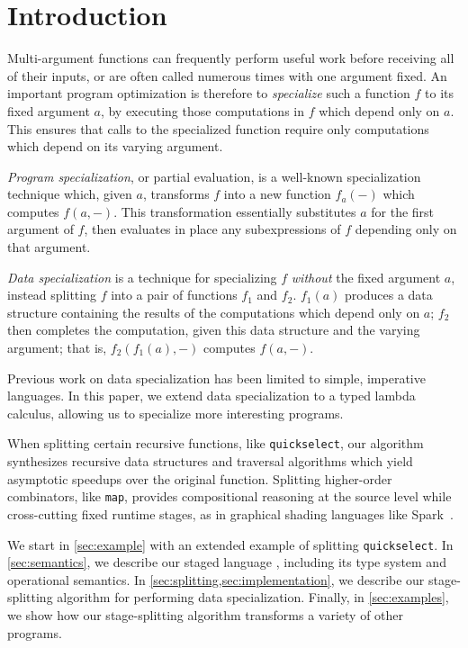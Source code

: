 \section{Introduction}

Multi-argument functions can frequently perform useful work before receiving all
of their inputs, or are often called numerous times with one argument fixed. An
important program optimization is therefore to \emph{specialize} such a function
$f$ to its fixed argument $a$, by executing those computations in $f$ which
depend only on $a$. This ensures that calls to the specialized function require
only computations which depend on its varying argument.

\emph{Program specialization}, or partial evaluation, is a well-known
specialization technique which, given $a$, transforms $f$ into a new function
$f_a(-)$ which computes $f(a,-)$. This transformation essentially substitutes
$a$ for the first argument of $f$, then evaluates in place any subexpressions of
$f$ depending only on that argument.

\emph{Data specialization} \cite{knoblock96} is a technique for specializing $f$
\emph{without} the fixed argument $a$, instead splitting $f$ into a pair of
functions $f_1$ and $f_2$. $f_1(a)$ produces a data structure containing the
results of the computations which depend only on $a$; $f_2$ then completes the
computation, given this data structure and the varying argument; that is,
$f_2(f_1(a),-)$ computes $f(a,-)$.

Previous work on data specialization has been limited to simple, imperative
languages. In this paper, we extend data specialization to a typed lambda
calculus, allowing us to specialize more interesting programs.

When splitting certain recursive functions, like \texttt{quickselect}, our
algorithm synthesizes recursive data structures and traversal algorithms which
yield asymptotic speedups over the original function. Splitting higher-order
combinators, like \texttt{map}, provides compositional reasoning at the source
level while cross-cutting fixed runtime stages, as in graphical shading
languages like Spark~\cite{Foley:2011}.

We start in \ref{sec:example} with an extended example of splitting
\texttt{quickselect}.
In \ref{sec:semantics}, we describe our staged language \lang, including its
type system and operational semantics.
In \ref{sec:splitting,sec:implementation}, we describe our stage-splitting
algorithm for performing data specialization.
Finally, in \ref{sec:examples}, we show how our stage-splitting algorithm
transforms a variety of other programs.
